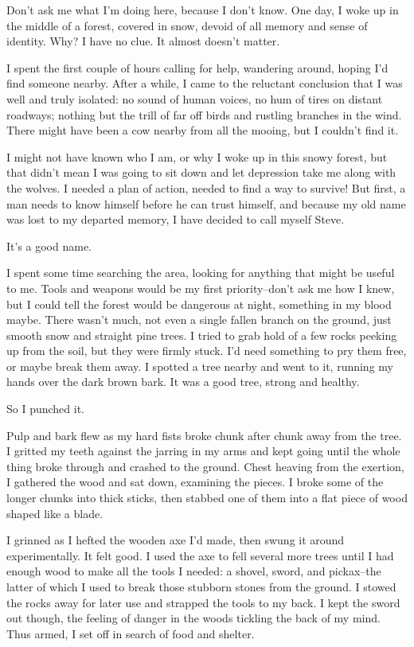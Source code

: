 \documentclass[
]{book}
\begin{document}
Don't ask me what I'm doing here, because I don't know. One day, I woke up in the middle of a forest, covered in snow, devoid of all memory and sense of identity. Why? I have no clue. It almost doesn't matter.

I spent the first couple of hours calling for help, wandering around, hoping I'd find someone nearby. After a while, I came to the reluctant conclusion that I was well and truly isolated: no sound of human voices, no hum of tires on distant roadways; nothing but the trill of far off birds and rustling branches in the wind. There might have been a cow nearby from all the mooing, but I couldn't find it.

I might not have known who I am, or why I woke up in this snowy forest, but that didn't mean I was going to sit down and let depression take me along with the wolves. I needed a plan of action, needed to find a way to survive! But first, a man needs to know himself before he can trust himself, and because my old name was lost to my departed memory, I have decided to call myself Steve.

It's a good name.

I spent some time searching the area, looking for anything that might be useful to me. Tools and weapons would be my first priority--don't ask me how I knew, but I could tell the forest would be dangerous at night, something in my blood maybe. There wasn't much, not even a single fallen branch on the ground, just smooth snow and straight pine trees. I tried to grab hold of a few rocks peeking up from the soil, but they were firmly stuck. I'd need something to pry them free, or maybe break them away. I spotted a tree nearby and went to it, running my hands over the dark brown bark. It was a good tree, strong and healthy.

So I punched it.

Pulp and bark flew as my hard fists broke chunk after chunk away from the tree. I gritted my teeth against the jarring in my arms and kept going until the whole thing broke through and crashed to the ground. Chest heaving from the exertion, I gathered the wood and sat down, examining the pieces. I broke some of the longer chunks into thick sticks, then stabbed one of them into a flat piece of wood shaped like a blade.

I grinned as I hefted the wooden axe I'd made, then swung it around experimentally. It felt good. I used the axe to fell several more trees until I had enough wood to make all the tools I needed: a shovel, sword, and pickax--the latter of which I used to break those stubborn stones from the ground. I stowed the rocks away for later use and strapped the tools to my back. I kept the sword out though, the feeling of danger in the woods tickling the back of my mind. Thus armed, I set off in search of food and shelter.
\end{document}
